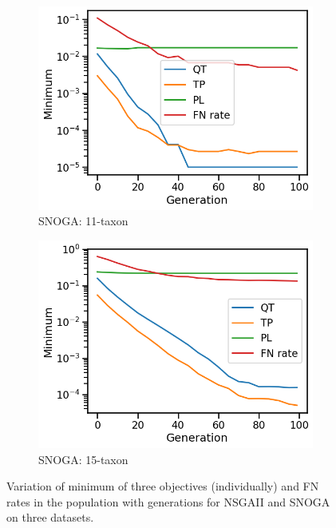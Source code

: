 \begin{figure}[!h]
\begin{subfigure}[b]{0.3\textwidth}
			\includegraphics[width=\textwidth]{Figure/11-taxon_NOSSGA_minimum}
			\caption{SNOGA: 11-taxon}
		\end{subfigure}%
		\begin{subfigure}[b]{0.3\textwidth}
			\includegraphics[width=\textwidth]{Figure/15-taxon_NOSSGA_minimum}
			\caption{SNOGA: 15-taxon}
		\end{subfigure}
		\caption{Variation of minimum of three objectives (individually) and FN rates in the population with generations for NSGAII and SNOGA on three datasets.	}
		\label{fig:gen_wise_min}
\end{figure}

